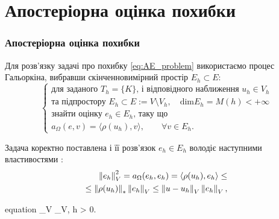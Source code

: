
\section{Апостеріорна оцінка похибки}
\frame{\sectionpage}
\begin{frame}[allowframebreaks]
	\frametitle<presentation>{Апостеріорна оцінка похибки}
	Для розв'язку задачі про похибку
		\eqref{eq:AE_problem} використаємо процес Гальоркіна, вибравши скінченновимірний простір $E_h \subset E$:
		\begin{equation}\label{eq:AEE_formulation}
			\begin{cases}
				\mbox{для заданого } T_h=\{K\} \text{, і відповідного наближення } u_h \in V_h \\
				\text{та підпростору } E_h \subset E:=V \setminus V_h, \quad \text{dim} E_h = M(h) < +\infty \\
				\text{знайти оцінку } e_h \in E_h \text{, таку що} \\
				a_\Omega(e,v) = \langle\rho(u_h), v\rangle, \qquad \forall v \in E_h.
			\end{cases}
		\end{equation}

		\framebreak

			Задача коректно поставлена і її розв'язок $e_h \in E_h$ володіє наступними властивостями :
			\begin{equation}
				\begin{split}
					\left\lVert e_h\right\rVert_V^2 = a_\Omega(e_h, e_h) = \langle\rho(u_h), e_h\rangle \le \\
					\le \left\lVert\rho(u_h)\right\rVert_* \left\lVert e_h\right\rVert_V \le \left\lVert u-u_h\right\rVert_V \left\lVert e_h\right\rVert_V,
				\end{split}
			\end{equation}

			\begin{empheq}[innerbox=\fbox]{equation}
				_V \le {}_V, \quad \forall h > 0.
			\end{empheq}

\end{frame}
